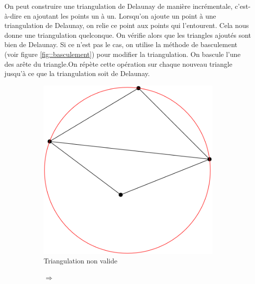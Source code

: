 On peut construire une triangulation de Delaunay de manière incrémentale, c'est-à-dire
en ajoutant les points un à un. Lorsqu'on ajoute un point à une triangulation de Delaunay,
on relie ce point aux points qui l'entourent. Cela nous donne une triangulation quelconque.
On vérifie alors que les triangles ajoutés sont bien de Delaunay. Si ce n'est pas le cas,
on utilise la méthode de basculement (voir figure \ref{fig::basculement}) pour modifier
la triangulation. On bascule l'une des arête du triangle.On répète cette opération
sur chaque nouveau triangle jusqu'à ce que la triangulation soit de Delaunay.

\begin{figure}[ht]
\centering
\begin{subfigure}{0.4\textwidth}
  \centering
  \includegraphics[width=\textwidth]{figures/invalid.png}
  \caption{Triangulation non valide}
  \label{fig::invalid}
\end{subfigure}%
\begin{subfigure}{0.2\textwidth}
  \centering
  $\Longrightarrow$
\end{subfigure}%
\begin{subfigure}{0.4\textwidth}
  \centering

\end{subfigure}
\end{figure}
